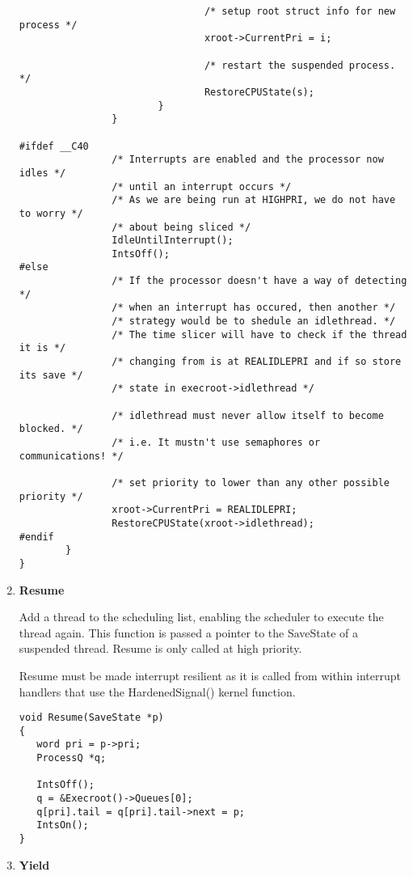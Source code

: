 \begin{enumerate}
\begin{verbatim}
                                /* setup root struct info for new process */
                                xroot->CurrentPri = i;
        
                                /* restart the suspended process. */
                                RestoreCPUState(s);
                        }
                }

#ifdef __C40
                /* Interrupts are enabled and the processor now idles */
                /* until an interrupt occurs */
                /* As we are being run at HIGHPRI, we do not have to worry */
                /* about being sliced */
                IdleUntilInterrupt();
                IntsOff();
#else
                /* If the processor doesn't have a way of detecting */
                /* when an interrupt has occured, then another */
                /* strategy would be to shedule an idlethread. */
                /* The time slicer will have to check if the thread it is */
                /* changing from is at REALIDLEPRI and if so store its save */
                /* state in execroot->idlethread */

                /* idlethread must never allow itself to become blocked. */
                /* i.e. It mustn't use semaphores or communications! */

                /* set priority to lower than any other possible priority */
                xroot->CurrentPri = REALIDLEPRI;
                RestoreCPUState(xroot->idlethread);
#endif
        }
}
\end{verbatim}
\normalsize

\item {\bf Resume}

Add a thread to the scheduling list, enabling the scheduler
to execute the thread again.
This function is passed a pointer to the SaveState of a suspended thread.
Resume is only called at high priority.

Resume must be made interrupt resilient
as it is called from within interrupt handlers that use the HardenedSignal()
kernel function.

\scriptsize
\begin{verbatim}
void Resume(SaveState *p)
{
   word pri = p->pri;
   ProcessQ *q;

   IntsOff();
   q = &Execroot()->Queues[0];
   q[pri].tail = q[pri].tail->next = p;
   IntsOn();
}
\end{verbatim}
\normalsize

\item {\bf Yield}


\end{enumerate}
